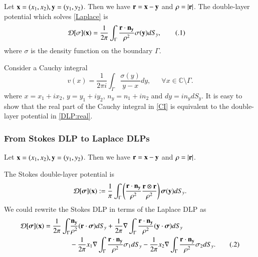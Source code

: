 \documentclass[preprint, 10pt]{elsarticle}
\newcommand{\Cdb}{\mbox{$\mathbb{C}$}}
\newcommand{\D}{\mbox{${\mathcal D}$}}
\newcommand\numberthis{\addtocounter{equation}{1}\tag{\theequation}}
\begin{document}
Let ${\bf x}=(x_1,x_2), {\bf y}=(y_1,y_2)$. Then we have ${\bf r}={\bf x} - {\bf y}$ and $\rho=|\bf r|$.
The double-layer potential which solves \eqref{Laplace} is 
\begin{align*}
\D[\sigma]({\bf x})&=\frac{1}{2\pi}\displaystyle\int_{\Gamma} \frac{{\bf r} \cdot {\bf n_y}}{\rho^2}\sigma({\bf y})dS_y,
\numberthis\label{DLP:real}
\end{align*}
where $\sigma$ is the density function on the boundary $\Gamma$.


Consider a Cauchy integral 
\begin{equation}\label{CI}
v({x})=\frac{1}{2\pi i}\int_{\Gamma}\frac{\sigma({ y})}{{ y}-{ x}} d{ y},\,\,\,\,\,\,\,\,\, \forall { x} \in \Cdb\setminus \Gamma.
\end{equation}
where ${ x}=x_1+ix_2$, $ { y}=y_1+iy_2$, ${ n_y}=n_1+i n_2$ and $d{ y}=i {n_y}dS_y$. It is easy to show that 
the real part of the Cauchy integral in \eqref{CI} is equivalent to the double-layer potential in \eqref{DLP:real}. 


\subsubsection{From Stokes DLP to Laplace DLPs}

Let ${\bf x}=(x_1,x_2), {\bf y}=(y_1,y_2)$. Then we have ${\bf r}={\bf x} - {\bf y}$ and $\rho=|\bf r|$.


The Stokes double-layer potential  is
\begin{equation}\label{StokesDLP1}
\D[\boldsymbol\sigma]({\bf x}):=\frac{1}{\pi}\int_{\Gamma}\left(\frac{{\bf r} \cdot {\bf n_y}}{\rho^2}\frac{{\bf r} \otimes {\bf r}}{\rho^2}\right) {\boldsymbol\sigma({\bf y})} d S_y.
\end{equation}
We could rewrite the Stokes DLP in terms of the Laplace DLP as
\begin{align*}\label{StokesDLP2}
\D[\boldsymbol\sigma]({\bf x})=\frac{1}{2\pi}\int_{\Gamma}&\frac{{\bf n_y}}{\rho^2}({\bf r} \cdot {\boldsymbol \sigma})dS_y+\frac{1}{2\pi}\nabla\int_{\Gamma}\frac{{\bf r} \cdot {\bf n_y}}{\rho^2}({\bf y} \cdot{\boldsymbol \sigma})dS_y\\
&-\frac{1}{2\pi}x_1 \nabla\int_{\Gamma}\frac{{\bf r} \cdot {\bf n_y}}{\rho^2}\sigma_1dS_y-\frac{1}{2\pi}x_2\nabla\int_{\Gamma}\frac{{\bf r} \cdot {\bf n_y}}{\rho^2}\sigma_2dS_y. \numberthis
\end{align*}
\end{document}
